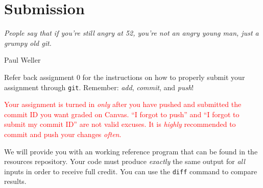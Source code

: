 \section{Submission}

\textwidth
\epigraph{\emph{People say that if you're still angry at 52, you're not an angry
young man, just a grumpy old git.}}{Paul Weller}

Refer back assignment 0 for the instructions on how to properly submit
your assignment through \texttt{git}. Remember: \emph{add},
\emph{commit}, and \emph{push}!

\textcolor{red}{Your assignment is turned in \emph{only} after you have
pushed and submitted the commit ID you want graded on Canvas. ``I
forgot to push'' and ``I forgot to submit my commit ID'' are not valid
excuses. It is \emph{highly} recommended to commit and push your changes
\emph{often}.}

We will provide you with an working reference program that can be found in the
resources repository. Your code must produce \emph{exactly} the same output for
\emph{all} inputs in order to receive full credit. You can use the \texttt{diff}
command to compare results.

